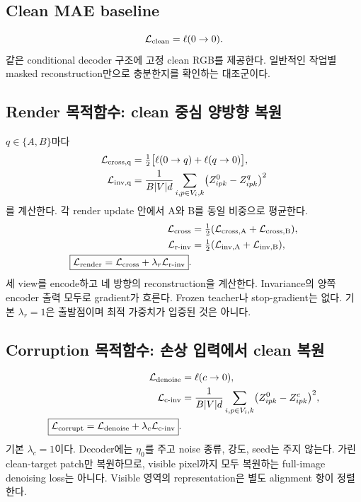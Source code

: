 \documentclass[11pt,a4paper]{article}
\newcommand{\Lc}{\mathcal{L}}
\begin{document}
\subsection{Clean MAE baseline}
\begin{equation}
\Lc_{\rm clean}=\ell(0\to0).
\end{equation}
같은 conditional decoder 구조에 고정 clean RGB를 제공한다. 일반적인
작업별 masked reconstruction만으로 충분한지를 확인하는 대조군이다.

\subsection{Render 목적함수: clean 중심 양방향 복원}
$q\in\{A,B\}$마다
\begin{align}
\Lc_{\rm cross,q}&=\tfrac12\bigl[\ell(0\to q)+\ell(q\to0)\bigr],\\
\Lc_{\rm inv,q}&=\frac{1}{B|V|d}\sum_{i,p\in V_i,k}
\bigl(Z^0_{ipk}-Z^q_{ipk}\bigr)^2
\end{align}
를 계산한다. 각 render update 안에서 A와 B를 동일 비중으로 평균한다.
\begin{align}
\Lc_{\rm cross}&=\tfrac12(\Lc_{\rm cross,A}+\Lc_{\rm cross,B}),\\
\Lc_{\rm r\text{-}inv}&=\tfrac12(\Lc_{\rm inv,A}+\Lc_{\rm inv,B}),\\
\boxed{\Lc_{\rm render}=\Lc_{\rm cross}+\lambda_r\Lc_{\rm r\text{-}inv}}.
\end{align}
세 view를 encode하고 네 방향의 reconstruction을 계산한다. Invariance의 양쪽
encoder 출력 모두로 gradient가 흐른다. Frozen teacher나 stop-gradient는 없다.
기본 $\lambda_r=1$은 출발점이며 최적 가중치가 입증된 것은 아니다.

\subsection{Corruption 목적함수: 손상 입력에서 clean 복원}
\begin{align}
\Lc_{\rm denoise}&=\ell(c\to0),\\
\Lc_{\rm c\text{-}inv}&=\frac{1}{B|V|d}\sum_{i,p\in V_i,k}
\bigl(Z^0_{ipk}-Z^c_{ipk}\bigr)^2,\\
\boxed{\Lc_{\rm corrupt}=\Lc_{\rm denoise}+\lambda_c\Lc_{\rm c\text{-}inv}}.
\end{align}
기본 $\lambda_c=1$이다. Decoder에는 $\eta_0$를 주고 noise 종류, 강도, seed는
주지 않는다. 가린 clean-target patch만 복원하므로, visible pixel까지 모두
복원하는 full-image denoising loss는 아니다. Visible 영역의 representation은
별도 alignment 항이 정렬한다.
\end{document}
